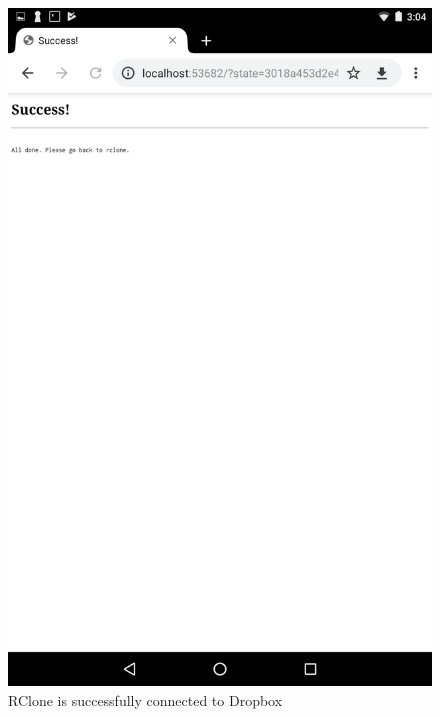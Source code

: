 \begin{figure}[htb]
  \centering
  \includegraphics[scale=0.2]{images/dropbox3.png}
  \caption{RClone is successfully connected to Dropbox}
  \label{fig:dropbox3}
\end{figure}
